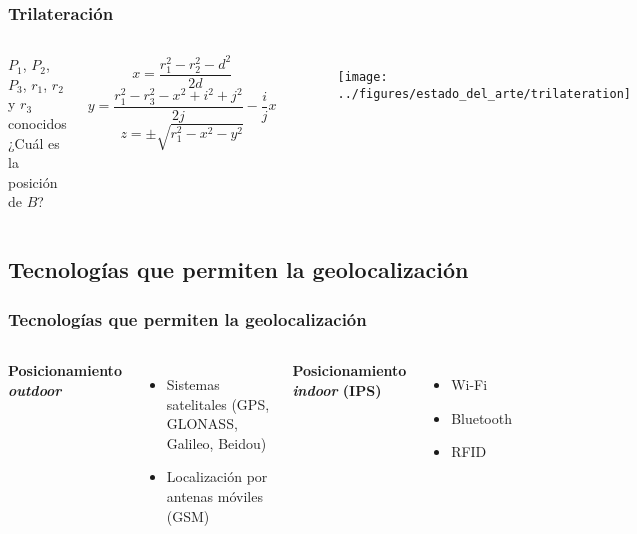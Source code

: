 \documentclass[mathserif]{beamer}
\begin{document}
\begin{frame}
\frametitle{Trilateración}

\begin{columns}[t] %


$P_1$, $P_2$, $P_3$, $r_1$, $r_2$ y $r_3$ conocidos
¿Cuál es la posición de $B$?

\vspace*{.1\textwidth}

\begin{equation*}
x=\frac{r_1^2-r_2^2-d^2}{2d}
\end{equation*}
\begin{equation*}
y=\frac{r_1^2-r_3^2-x^2+i^2+j^2}{2j}-\frac{i}{j}x
\end{equation*}
\begin{equation*}
z=\pm\sqrt{r_1^2-x^2-y^2}
\end{equation*}

\begin{figure}
\texttt{[image: ../figures/estado\_del\_arte/trilateration]}
\end{figure}

\end{columns}

\end{frame}


\subsection{Tecnologías que permiten la geolocalización}

\begin{frame}
\frametitle{Tecnologías que permiten la geolocalización}

\begin{columns}[t]

\textbf{Posicionamiento \textit{outdoor}}

\begin{itemize}
\item Sistemas satelitales (GPS, GLONASS, Galileo, Beidou)
\item Localización por antenas móviles (GSM)
\end{itemize}


\textbf{Posicionamiento \textit{indoor} (IPS)}

\begin{itemize}
\item Wi-Fi
\item Bluetooth
\item RFID
\end{itemize}

\end{columns}

\end{frame}
\end{document}
